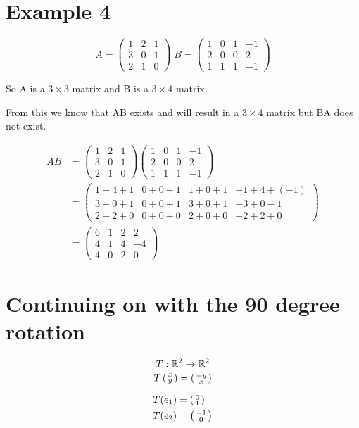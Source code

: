 \documentclass[a4paper]{article}
\begin{document}
\section*{Example 4}
\[
A =
\begin{pmatrix}
	1&2&1\\
	3&0&1\\
	2&1&0
\end{pmatrix} \;
B = 
\begin{pmatrix}
	1&0&1&-1\\
	2&0&0&2\\
	1&1&1&-1
\end{pmatrix}
\]

So A is a $3 \times 3$ matrix and B is a $3 \times 4$ matrix.

From this we know that AB exists and will result in a $3 \times 4$ matrix but BA does not exist.

\[
	\begin{aligned}
		AB &=
		\begin{pmatrix}
	1&2&1\\
	3&0&1\\
	2&1&0
\end{pmatrix} 
\begin{pmatrix}
	1&0&1&-1\\
	2&0&0&2\\
	1&1&1&-1
\end{pmatrix} \\
&= 
\begin{pmatrix}
	1+4+1 & 0+0+1 & 1+0+1 & -1+4+(-1) \\
	3+0+1 & 0+0+1 & 3+0+1 & -3+0-1 \\
	2+2+0 & 0+0+0 & 2+0+0 & -2+2+0
\end{pmatrix} \\
&= 
\begin{pmatrix}
	6&1&2&2\\
	4&1&4&-4\\
	4&0&2&0
\end{pmatrix}
	\end{aligned}
\]

\section*{Continuing on with the 90 degree rotation}
\[T: \mathbb{R}^2 \to \mathbb{R}^2\]
\[T\left(\begin{smallmatrix} x\\y \end{smallmatrix} \right) = \left(\begin{smallmatrix} -y\\x \end{smallmatrix} \right)\]

\[
	\begin{aligned}
		T(e_1) &= \left(\begin{smallmatrix} 0\\1 \end{smallmatrix} \right) \\
		T(e_2) &= \left(\begin{smallmatrix} -1\\0 \end{smallmatrix} \right)
	\end{aligned}
\]
\end{document}
